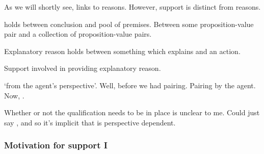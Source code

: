 \begin{note}
  As we will shortly see, links to reasons.
  However, support is distinct from reasons.

   holds between conclusion and pool of premises.
  Between some proposition-value pair and a collection of proposition-value pairs.

  Explanatory reason holds between something which explains and an action.

  Support involved in providing explanatory reason.
\end{note}

\begin{note}
  `from the agent's perspective'.
  Well, before we had pairing.
  Pairing by the agent.
  Now, \support{}.

  Whether or not the qualification needs to be in place is unclear to me.
  Could just say \support{}, and so it's implicit that \support{} is perspective dependent.
\end{note}

\subsubsection{Motivation for support I}

